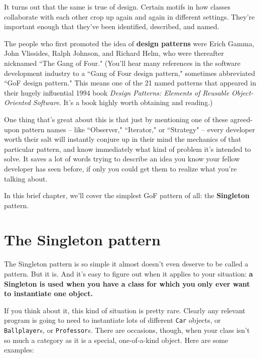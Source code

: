 It turns out that the same is true of design. Certain motifs in how classes
collaborate with each other crop up again and again in different settings.
They're important enough that they've been identified, described, and named.

The people who first promoted the idea of \textbf{design patterns} were Erich
Gamma, John Vlissides, Ralph Johnson, and Richard Helm, who were thereafter
nicknamed ``The Gang of Four." (You'll hear many references in the software
development industry to a ``Gang of Four design pattern," sometimes
abbreviated ``GoF design pattern." This means one of the 21 named patterns
that appeared in their hugely influential 1994 book \textit{Design Patterns:
Elements of Reusable Object-Oriented Software}. It's a book highly worth
obtaining and reading.)

One thing that's great about this is that just by mentioning one of these
agreed-upon pattern names -- like ``Observer," ``Iterator," or ``Strategy" --
every developer worth their salt will instantly conjure up in their mind the
mechanics of that particular pattern, and know immediately what kind of
problem it's intended to solve. It saves a lot of words trying to describe an
idea you know your fellow developer has seen before, if only you could get
them to realize what you're talking about.

In this brief chapter, we'll cover the simplest GoF pattern of all:
the \textbf{Singleton} pattern.

\section{The Singleton pattern}

The Singleton pattern is so simple it almost doesn't even deserve to be called
a pattern. But it is. And it's easy to figure out when it applies to your
situation: \textbf{a Singleton is used when you have a class for which you
only ever want to instantiate one object.}

If you think about it, this kind of situation is pretty rare. Clearly any
relevant program is going to need to instantiate lots of different
\texttt{Car} objects, or \texttt{Ballplayer}s, or \texttt{Professor}s. There
are occasions, though, when your class isn't so much a category as it is a
special, one-of-a-kind object. Here are some examples:

